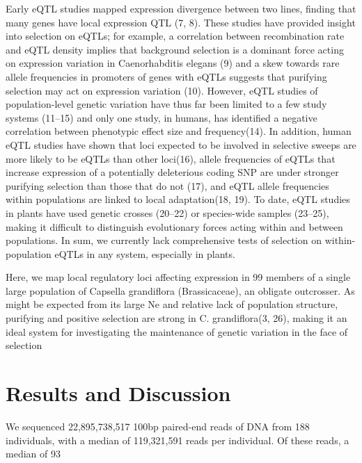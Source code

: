 Early eQTL studies mapped expression divergence between two lines, finding that many genes have local expression QTL (7, 8). These studies have provided insight into selection on eQTLs; for example,  a correlation between recombination rate and eQTL density implies that background selection is a dominant force acting on expression variation in Caenorhabditis elegans (9) and a skew towards rare allele frequencies in promoters of genes with eQTLs suggests that purifying selection may act on expression variation (10). However, eQTL studies of population-level genetic variation have thus far been limited to a few study systems (11–15) and only one study, in humans, has identified a negative correlation between phenotypic effect size and frequency(14). In addition, human eQTL studies have shown that loci expected to be involved in selective sweeps are more likely to be eQTLs than other loci(16), allele frequencies of eQTLs that increase expression of a potentially deleterious coding SNP are under stronger purifying selection than those that do not (17), and eQTL allele frequencies within populations are linked to local adaptation(18, 19). To date, eQTL studies in plants have used genetic crosses (20–22) or species-wide samples (23–25), making it difficult to distinguish evolutionary forces acting within and between populations. In sum, we currently lack comprehensive tests of selection on within-population eQTLs in any system, especially in plants.

Here, we map local regulatory loci affecting expression in 99 members of a single large population of Capsella grandiflora (Brassicaceae), an obligate outcrosser. As might be expected from its large Ne and relative lack of population structure, purifying and positive selection are strong in C. grandiflora(3, 26), making it an ideal system for investigating the maintenance of genetic variation in the face of selection 

\section{Results and Discussion}
We sequenced 22,895,738,517 100bp paired-end reads of DNA from 188 individuals, with a median of 119,321,591 reads per individual. Of these reads, a median of 93%

